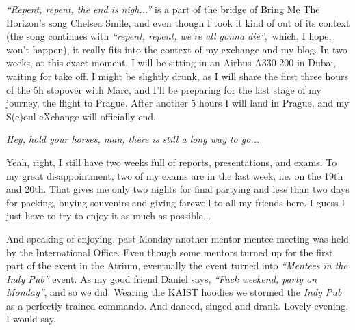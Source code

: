 \begin{post}
	\begin{content}
\textit{``Repent, repent, the end is nigh...''} is a part of the bridge of Bring Me The Horizon's song Chelsea Smile, and even though I took it kind of out of its context (the song continues with \textit{``repent, repent, we're all gonna die''}, which, I hope, won't happen), it really fits into the context of my exchange and my blog. In two weeks, at this exact moment, I will be sitting in an Airbus A330-200 in Dubai, waiting for take off. I might be slightly drunk, as I will share the first three hours of the 5h stopover with Marc, and I'll be preparing for the last stage of my journey, the flight to Prague. After another 5 hours I will land in Prague, and my S(e)oul eXchange will officially end.

\textit{Hey, hold your horses, man, there is still a long way to go...}

Yeah, right, I still have two weeks full of reports, presentations, and exams. To my great disappointment, two of my exams are in the last week, i.e. on the 19th and 20th. That gives me only two nights for final partying and less than two days for packing, buying souvenirs and giving farewell to all my friends here. I guess I just have to try to enjoy it as much as possible...

And speaking of enjoying, past Monday another mentor-mentee meeting was held by the International Office. Even though some mentors turned up for the first part of the event in the Atrium, eventually the event turned into \textit{``Mentees in the Indy Pub''} event. As my good friend Daniel says, \textit{``Fuck weekend, party on Monday''}, and so we did. Wearing the KAIST hoodies we stormed the \textit{Indy Pub} as a perfectly trained commando. And danced, singed and drank. Lovely evening, I would say.


\end{content}
\end{post}
